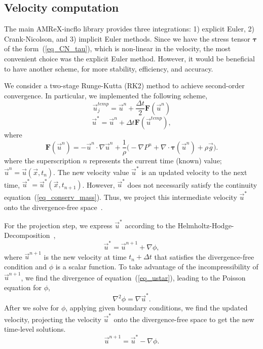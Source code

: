 \subsection{Velocity computation}
The main AMReX-incflo library provides three integrations: 1) explicit Euler, 2) Crank-Nicolson, and 3) implicit Euler methods. 
Since we have the stress tensor ${\bm \tau}$ of the form~(\ref{eq_CN_tau}), which is non-linear in the velocity, the most convenient choice was the explicit Euler method.
 However, it would be beneficial to have another scheme, for more stability, efficiency, and accuracy. 
 \par
 We consider a two-stage Runge-Kutta (RK2) method to achieve second-order convergence. 
In particular, we implemented the following scheme,
\begin{equation}
	\vec{u}_{j}^{temp} = \vec{u}^{n} + \frac{\Delta t}{2} {\bm F} \left( \vec{u}^{n} \right)
	\label{eq_RK2_s1} 
\end{equation}
\begin{equation}
	\vec{u}^{*} = \vec{u}^{n} + \Delta t {\bm F} \left( \vec{u}^{temp} \right),
	\label{eq_RK2_s2}
\end{equation}
where 
\[
  {\bm F} \left( \vec{u}^{n} \right)= 
    -\vec{u}^n \cdot \nabla \vec{u}^n 
    +\frac{1}{\rho}
    \biggl(
    - \nabla P^n 
        + \nabla \cdot   \bm{\tau}(\vec{u}^n)
        +  \rho  \vec{g} 
        \biggr).
\]
where the superscription $n$ represents the current time (known) value; $\vec{u}^n = \vec{u}(\vec{x}, t_n)$. The new velocity value $\vec{u}^*$ is an updated velocity to the next time, $\vec{u}^*  = \vec{u}^* (\vec{x}, t_{n+1})$. However, $\vec{u}^*$ does not necessarily satisfy the continuity equation~(\ref{eq_conserv_mass}). Thus, we project this intermediate velocity $\vec{u}^*$ onto the divergence-free space~\cite{sverdrup_highly_2018}.
\par
For the projection step, we express $\vec{u}^{*}$ according to the Helmholtz-Hodge-Decomposition~\cite{chorin_mathematical_1993}, 
\begin{equation}
  \vec{u}^* = \vec{u}^{n+1} + \nabla \phi,
  \label{eq_ustar}
\end{equation}
where $\vec{u}^{n+1}$ is the new velocity at time $t_n + \Delta t$ that satisfies the divergence-free condition and $\phi$ is a scalar function.
To take advantage of the incompressibility of $\vec{u}^{n+1}$, we find the divergence of equation~(\ref{eq_ustar}), leading to the Poisson equation for $\phi$,
\[
  \nabla^2 \phi = \nabla \vec{u}^*.  
\]
After we solve for $\phi$, applying given boundary conditions, we find the updated velocity, projecting the velocity $\vec{u}^*$ onto the divergence-free space to get the new time-level solutions.
\[
  \vec{u}^{n+1} = \vec{u}^* - \nabla \phi.
\]

